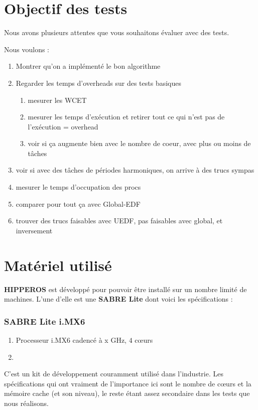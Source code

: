 \section{Objectif des tests}

	Nous avons plusieurs attentes que vous souhaitons évaluer avec des tests.

	Nous voulons :
	\begin{enumerate}
	\setlength\itemsep{0.1em}
		\item Montrer qu'on a implémenté le bon algorithme
		\item Regarder les temps d'overheads sur des tests basiques
		\begin{enumerate}
			\item mesurer les WCET
			\item mesurer les temps d'exécution et retirer tout ce qui n'est pas de l'exécution = overhead
			\item voir si ça augmente bien avec le nombre de coeur, avec plus ou moins de tâches
		\end{enumerate}
		\item voir si avec des tâches de périodes harmoniques, on arrive à des trucs sympas
		\item mesurer le temps d'occupation des procs
		\item comparer pour tout ça avec Global-EDF
		\item trouver des trucs faisables avec UEDF, pas faisables avec global, et inversement
	\end{enumerate}
	

\section{Matériel utilisé}
	\textbf{HIPPEROS} est développé pour pouvoir être installé sur un nombre limité de machines. 
	L'une d'elle est une \textbf{SABRE Lite} dont voici les spécifications :
	
	\subsubsection{SABRE Lite i.MX6}
		\begin{enumerate}
			\setlength\itemsep{0.1em}
			\item Processeur i.MX6 cadencé à x GHz, $4$ cœurs
			\item 
		\end{enumerate}
	C'est un kit de développement couramment utilisé dans l'industrie. Les spécifications qui 
	ont vraiment de l'importance ici sont le nombre de cœurs et la mémoire cache (et son niveau), 
	le reste étant assez secondaire dans les tests que nous réalisons.

